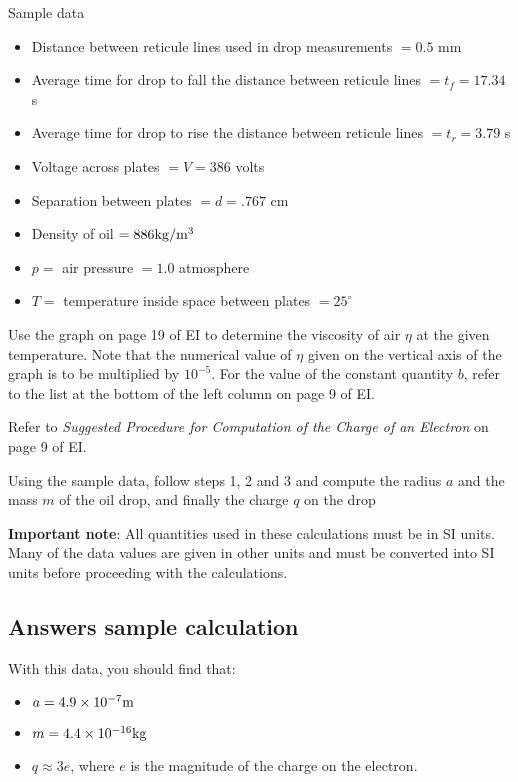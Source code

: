 \documentclass{article}
\begin{document}
Sample data
\begin{itemize}
\item Distance between reticule lines used in drop measurements $= 0.5$
mm

\item Average time for drop to fall the distance between
reticule lines $= t_f = 17.34$ s

\item Average time for drop to rise the distance between
reticule lines $= t_r = 3.79$ s

\item Voltage across plates $= V = 386$ volts

\item Separation between plates $= d = .767$ cm

\item Density of oil $= 886 {\rm kg}/{\rm m}^3$

\item $p =$ air pressure $= 1.0 $ atmosphere

\item $T = $ temperature inside space between plates $ = 25^\circ$
\end{itemize}

Use the graph on page 19 of EI to determine the viscosity of air $\eta$ at
the given temperature.  Note that the numerical value of
$\eta$ given on the vertical axis of the graph is
to be multiplied by $10^{-5}$.  For
the value of the constant quantity $b$, refer to the list at the bottom
of the left column on page 9 of EI.

Refer to {\em Suggested Procedure for Computation of
the Charge of an Electron} on page 9 of EI.

Using the sample data, follow steps 1, 2 and 3 and compute the radius $a$
and the mass $m$ of the oil drop, and finally the charge $q$ on the drop

{\bf Important note}: All quantities used in these
calculations must be in SI units. Many of the data values are given in
other units and must be converted into SI units before proceeding with
the calculations.

\subsection{Answers sample calculation}

With this data, you should find that:
\begin{itemize}
\item $a = 4.9 \times 10^{-7} {\rm m}$

\item $m = 4.4 \times 10^{-16} {\rm kg}$

\item $q \approx 3e$, where $e$ is the magnitude of
the charge on the electron.
\end{itemize}
\end{document}
